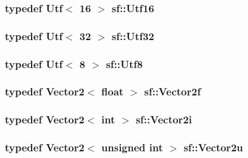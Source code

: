 \hypertarget{namespacesf_a0868ce4b7cda7b545427fe9044e456e2}{
\subsubsection[{Utf16}]{\setlength{\rightskip}{0pt plus 5cm}typedef {\bf Utf}$<$ 16 $>$ {\bf sf\-::\-Utf16}}}\label{namespacesf_a0868ce4b7cda7b545427fe9044e456e2}
\hypertarget{namespacesf_ae8ddf58bb1d012fc076ea9d4f8ec2feb}{
\subsubsection[{Utf32}]{\setlength{\rightskip}{0pt plus 5cm}typedef {\bf Utf}$<$ 32 $>$ {\bf sf\-::\-Utf32}}}\label{namespacesf_ae8ddf58bb1d012fc076ea9d4f8ec2feb}
\hypertarget{namespacesf_a8626e71b97fd5e81b6c02cdfe775780f}{
\subsubsection[{Utf8}]{\setlength{\rightskip}{0pt plus 5cm}typedef {\bf Utf}$<$ 8 $>$ {\bf sf\-::\-Utf8}}}\label{namespacesf_a8626e71b97fd5e81b6c02cdfe775780f}
\hypertarget{namespacesf_a80cea3c46537294fd1d8d428566ad8b2}{
\subsubsection[{Vector2f}]{\setlength{\rightskip}{0pt plus 5cm}typedef {\bf Vector2}$<$ float $>$ {\bf sf\-::\-Vector2f}}}\label{namespacesf_a80cea3c46537294fd1d8d428566ad8b2}
\hypertarget{namespacesf_a0eed58bf66694ebbc55f72ca7de840d9}{
\subsubsection[{Vector2i}]{\setlength{\rightskip}{0pt plus 5cm}typedef {\bf Vector2}$<$ {\bf int} $>$ {\bf sf\-::\-Vector2i}}}\label{namespacesf_a0eed58bf66694ebbc55f72ca7de840d9}
\hypertarget{namespacesf_a41039649eb65ea7646e2b97cfe124b4f}{
\subsubsection[{Vector2u}]{\setlength{\rightskip}{0pt plus 5cm}typedef {\bf Vector2}$<$ {\bf unsigned} {\bf int} $>$ {\bf sf\-::\-Vector2u}}}\label{namespacesf_a41039649eb65ea7646e2b97cfe124b4f}
